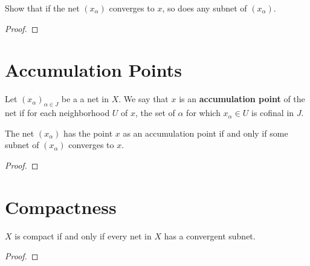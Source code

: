 \documentclass[12pt]{article}
\begin{document}
Show that if the net $(x_\alpha)$ converges to $x$, so does any subnet of $(x_\alpha)$.
\begin{proof}
\end{proof}

\section{Accumulation Points}
\begin{defn}
	Let ${(x_\alpha)}_{\alpha\in J}$ be a a net in $X$. We say that $x$ is an \textbf{accumulation point} of the net if for each neighborhood $U$ of $x$, the set of $\alpha$ for which $x_\alpha \in U$ is cofinal in $J$.
\end{defn}

\begin{lemma}
	The net $(x_\alpha)$ has the point $x$ as an accumulation point if and only if some subnet of $(x_\alpha)$ converges to $x$.
\end{lemma}
\begin{proof}
\end{proof}

\section{Compactness}
\begin{thm}
	$X$ is compact if and only if every net in $X$ has a convergent subnet.
\end{thm}
\begin{proof}
\end{proof}
\end{document}
